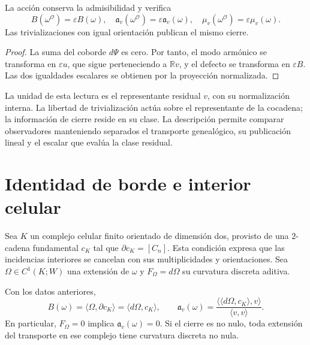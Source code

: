 \begin{proposition}
\label{x_reciprocidad:vii:prop:observador-covarianza}
La acción conserva la admisibilidad y verifica
\[
 B(\omega^{\mathcal O})=\varepsilon B(\omega),\quad
 \mathfrak a_v(\omega^{\mathcal O})=\varepsilon\mathfrak a_v(\omega),
 \quad \mu_v(\omega^{\mathcal O})=\varepsilon\mu_v(\omega).
\]
Las trivializaciones con igual orientación publican el mismo cierre.
\end{proposition}

\begin{proof}
La suma del coborde \(d\Psi\) es cero. Por tanto, el modo armónico
se transforma en \(\varepsilon u\), que sigue perteneciendo a
\(\mathbb Rv\), y el defecto se transforma en \(\varepsilon B\).
Las dos igualdades escalares se obtienen por la proyección normalizada.
\end{proof}

La unidad de esta lectura es el representante residual \(v\), con su
normalización interna. La libertad de trivialización actúa sobre el
representante de la cocadena; la información de cierre reside en su
clase. La descripción permite comparar observadores manteniendo
separados el transporte genealógico, su publicación lineal y el escalar
que evalúa la clase residual.

\section{Identidad de borde e interior celular}
\label{x_reciprocidad:vii:sec:observador-stokes}

Sea \(K\) un complejo celular finito orientado de dimensión dos,
provisto de una \(2\)-cadena fundamental \(c_K\) tal que
\(\partial c_K=[C_n]\). Esta condición expresa que las incidencias
interiores se cancelan con sus multiplicidades y orientaciones.
Sea \(\Omega\in C^1(K;W)\) una extensión de \(\omega\) y
\(F_\Omega=d\Omega\) su curvatura discreta aditiva.

\begin{theorem}
\label{x_reciprocidad:vii:thm:observador-stokes}
Con los datos anteriores,
\begin{equation}
 B(\omega)=\langle\Omega,\partial c_K\rangle
          =\langle d\Omega,c_K\rangle,
 \qquad
 \mathfrak a_v(\omega)
 =\frac{\langle\langle d\Omega,c_K\rangle,v\rangle}
        {\langle v,v\rangle}.
 \label{x_reciprocidad:vii:eq:observador-stokes}
\end{equation}
En particular, \(F_\Omega=0\) implica \(\mathfrak a_v(\omega)=0\).
Si el cierre es no nulo, toda extensión del transporte en ese complejo
tiene curvatura discreta no nula.
\end{theorem}

